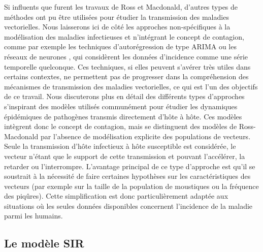 Si influents que furent les travaux de Ross et Macdonald, d'autres types de méthodes ont pu être utilisées pour étudier la transmission des maladies vectorielles.
Nous laisserons ici de côté les approches non-spécifiques à la modélisation des maladies infectieuses et n'intégrant le concept de contagion, comme par exemple les techniques d'autorégression de type ARIMA \cite{promprou2006forecasting} ou les réseaux de neurones \cite{yu2014application}, qui considèrent les données d'incidence comme une série temporelle quelconque.
Ces techniques, si elles peuvent s'avérer très utiles dans certains contextes, ne permettent pas de progresser dans la compréhension des mécanismes de transmission des maladies vectorielles, ce qui est l'un des objectifs de ce travail.
Nous discuterons plus en détail des différents types d'approches s'inspirant des modèles utilisés communément pour étudier les dynamiques épidémiques de pathogènes transmis directement d'hôte à hôte.
Ces modèles intègrent donc le concept de contagion, mais se distinguent des modèles de Ross-Macdonald par l'absence de modélisation explicite des populations de vecteurs.
Seule la transmission d'hôte infectieux à hôte susceptible est considérée, le vecteur n'étant que le support de cette transmission et pouvant l'accélérer, la retarder ou l'interrompre.
L'avantage principal de ce type d'approche est qu'il se soustrait à la nécessité de faire certaines hypothèses sur les caractéristiques des vecteurs (par exemple sur la taille de la population de moustiques ou la fréquence des piqûres).
Cette simplification est donc particulièrement adaptée aux situations où les seules données disponibles concernent l'incidence de la maladie parmi les humains.


\subsection{Le modèle SIR}



